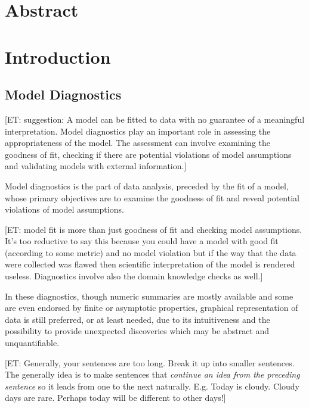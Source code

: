 \documentclass{monashthesis}
\begin{document}
\hypertarget{abstract-1}{%
\section{Abstract}\label{abstract-1}}

\hypertarget{introduction}{%
\section{Introduction}\label{introduction}}

\hypertarget{model-diagnostics}{%
\subsection{Model Diagnostics}\label{model-diagnostics}}

{[}ET: suggestion: A model can be fitted to data with no guarantee of a meaningful interpretation. Model diagnostics play an important role in assessing the appropriateness of the model. The assessment can involve examining the goodness of fit, checking if there are potential violations of model assumptions and validating models with external information.{]}

Model diagnostics is the part of data analysis, preceded by the fit of a model, whose primary objectives are to examine the goodness of fit and reveal potential violations of model assumptions.

{[}ET: model fit is more than just goodness of fit and checking model assumptions. It's too reductive to say this because you could have a model with good fit (according to some metric) and no model violation but if the way that the data were collected was flawed then scientific interpretation of the model is rendered useless. Diagnostics involve also the domain knowledge checks as well.{]}

In these diagnostics, though numeric summaries are mostly available and some are even endorsed by finite or asymptotic properties, graphical representation of data is still preferred, or at least needed, due to its intuitiveness and the possibility to provide unexpected discoveries which may be abstract and
unquantifiable.

{[}ET: Generally, your sentences are too long. Break it up into smaller sentences. The generally idea is to make sentences that \emph{continue an idea from the preceding sentence} so it leads from one to the next naturally. E.g. Today is cloudy. Cloudy days are rare. Perhaps today will be different to other days!{]}
\end{document}

